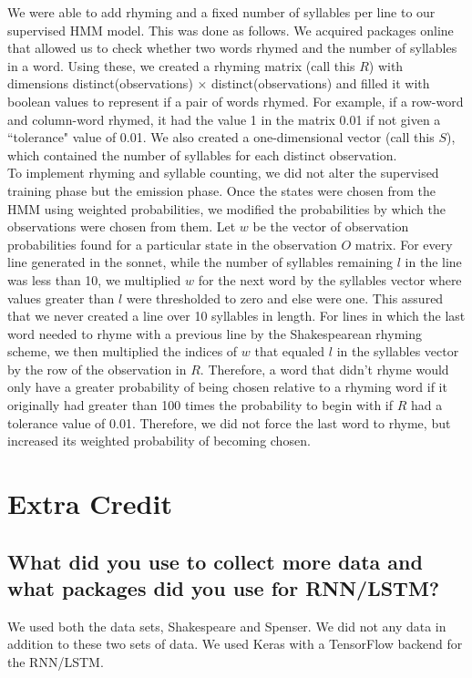 We were able to add rhyming and a fixed number of syllables per line to our supervised HMM model. This was done as follows. We acquired packages online that allowed us to check whether two words rhymed and the number of syllables in a word. Using these, we created a rhyming matrix (call this $R$) with dimensions distinct(observations) $\times$ distinct(observations) and filled it with boolean values to represent if a pair of words rhymed. For example, if a row-word and column-word rhymed, it had the value 1 in the matrix 0.01 if not given a ``tolerance" value of 0.01. We also created a one-dimensional vector (call this $S$), which contained the number of syllables for each distinct observation.\\
\indent To implement rhyming and syllable counting, we did not alter the supervised training phase but the emission phase. Once the states were chosen from the HMM using weighted probabilities, we modified the probabilities by which the observations were chosen from them. Let $w$ be the vector of observation probabilities found for a particular state in the observation $O$ matrix. For every line generated in the sonnet, while the number of syllables remaining $l$ in the line was less than 10, we multiplied $w$ for the next word by the syllables vector where values greater than $l$ were thresholded to zero and else were one. This assured that we never created a line over 10 syllables in length. For lines in which the last word needed to rhyme with a previous line by the Shakespearean rhyming scheme, we then multiplied the indices of $w$ that equaled $l$ in the syllables vector by the row of the observation in $R$. Therefore, a word that didn't rhyme would only have a greater probability of being chosen relative to a rhyming word if it originally had greater than 100 times the probability to begin with if $R$ had a tolerance value of 0.01. Therefore, we did not force the last word to rhyme, but increased its weighted probability of becoming chosen.


\section{Extra Credit}
\medskip

\subsection{What did you use to collect more data and what packages did you use for RNN/LSTM?}
We used both the data sets, Shakespeare and Spenser. We did not any data in addition to these two sets of data. We used Keras with a TensorFlow backend for the RNN/LSTM.
